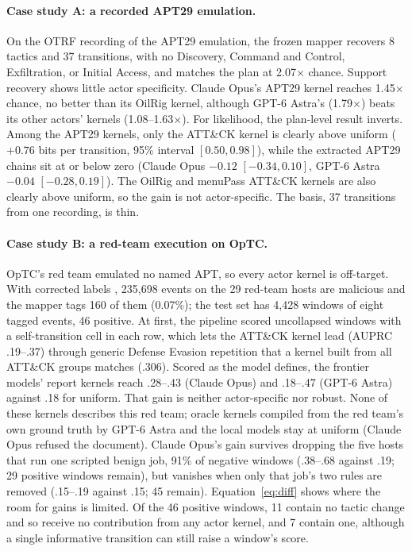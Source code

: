 \documentclass[letterpaper]{article} %
\begin{document}
\paragraph{Case study A: a recorded APT29 emulation.} On the OTRF recording of the APT29 emulation, the frozen mapper recovers 8 tactics and 37 transitions, with no Discovery, Command and Control, Exfiltration, or Initial Access, and matches the plan at 2.07$\times$ chance. Support recovery shows little actor specificity. Claude Opus's APT29 kernel reaches 1.45$\times$ chance, no better than its OilRig kernel, although GPT-6 Astra's (1.79$\times$) beats its other actors' kernels (1.08--1.63$\times$). For likelihood, the plan-level result inverts. Among the APT29 kernels, only the ATT\&CK kernel is clearly above uniform ($+0.76$ bits per transition, 95\% interval $[0.50, 0.98]$), while the extracted APT29 chains sit at or below zero (Claude Opus $-0.12$ $[-0.34, 0.10]$, GPT-6 Astra $-0.04$ $[-0.28, 0.19]$). The OilRig and menuPass ATT\&CK kernels are also clearly above uniform, so the gain is not actor-specific. The basis, 37 transitions from one recording, is thin.

\paragraph{Case study B: a red-team execution on OpTC.} OpTC's red team emulated no named APT, so every actor kernel is off-target. With corrected labels \citep{majorczyk2025optc}, 235,698 events on the 29 red-team hosts are malicious and the mapper tags 160 of them (0.07\%); the test set has 4,428 windows of eight tagged events, 46 positive. At first, the pipeline scored uncollapsed windows with a self-transition cell in each row, which lets the ATT\&CK kernel lead (AUPRC .19--.37) through generic Defense Evasion repetition that a kernel built from all ATT\&CK groups matches (.306). Scored as the model defines, the frontier models' report kernels reach .28--.43 (Claude Opus) and .18--.47 (GPT-6 Astra) against .18 for uniform. That gain is neither actor-specific nor robust. None of these kernels describes this red team; oracle kernels compiled from the red team's own ground truth by GPT-6 Astra and the local models stay at uniform (Claude Opus refused the document). Claude Opus's gain survives dropping the five hosts that run one scripted benign job, 91\% of negative windows (.38--.68 against .19; 29 positive windows remain), but vanishes when only that job's two rules are removed (.15--.19 against .15; 45 remain). Equation~\eqref{eq:diff} shows where the room for gains is limited. Of the 46 positive windows, 11 contain no tactic change and so receive no contribution from any actor kernel, and 7 contain one, although a single informative transition can still raise a window's score.
\end{document}
